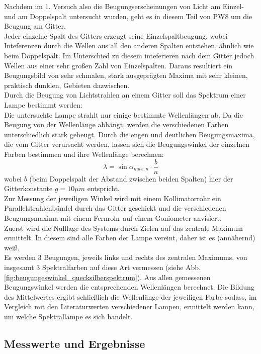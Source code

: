 \documentclass[12pt,a4paper]{article}
\begin{document}
\begin{multicols}{2}
Nachdem im 1. Versuch also die Beugungserscheinungen von Licht am Einzel- und am Doppelspalt
untersucht wurden, geht es in diesem Teil von PW8 um die Beugung am Gitter.\\
Jeder einzelne Spalt des Gitters erzeugt seine Einzelspaltbeugung, wobei Inteferenzen durch die Wellen aus all den anderen Spalten entstehen, ähnlich wie beim Doppelspalt. Im Unterschied zu diesem inteferieren nach dem Gitter jedoch Wellen aus einer sehr großen Zahl von Einzelspalten.
Daraus resultiert ein Beugungsbild von sehr schmalen, stark ausgeprägten Maxima mit sehr kleinen, praktisch dunklen, Gebieten dazwischen.\\
Durch die Beugung von Lichtstrahlen an einem Gitter soll das Spektrum einer Lampe bestimmt werden:\\
Die untersuchte Lampe strahlt nur einige bestimmte Wellenlängen ab. Da die Beugung von der Wellenlänge abhängt, werden die verschiedenen Farben unterschiedlich stark gebeugt. Durch die engen und deutlichen Beugungsmaxima, die vom Gitter verursacht werden, lassen sich die Beugungswinkel der einzelnen Farben bestimmen und ihre Wellenlänge berechnen:
$$\lambda = \sin{\alpha_{max,n}}\cdot \frac{b}{n}$$
wobei $b$ (beim Doppelspalt der Abstand zwischen beiden Spalten) hier der Gitterkonstante $g=10 \mu m$ entspricht.\\
Zur Messung der jeweiligen Winkel wird mit einem Kollimatorrohr ein Parallelstrahlenbündel durch das Gitter geschickt und die verschiedenen Beugungsmaxima mit einem Fernrohr auf einem Goniometer anvisiert.\\
Zuerst wird die Nulllage des Systems durch Zielen auf das zentrale Maximum ermittelt. In diesem sind alle Farben der Lampe vereint, daher ist es (annähernd) weiß.\\
Es werden 3 Beugungen, jeweils links und rechts des zentralen Maximums, von insgesamt 3 Spektralfarben auf diese Art vermessen (siehe Abb. \ref{fig:beugungeswinkel_quecksilberspektrum}). Aus allen gemessenen Beugungswinkel werden die entsprechenden Wellenlängen berechnet. Die Bildung des Mittelwertes ergibt schließlich die Wellenlänge der jeweiligen Farbe sodass, im Vergleich mit den Literaturwerten verschiedener Lampen, ermittelt werden kann, um welche Spektrallampe es sich handelt.

\subsection{Messwerte und Ergebnisse}


\end{multicols}
\end{document}
